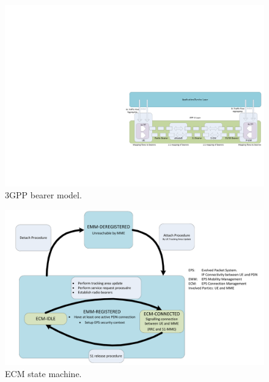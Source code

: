\begin{figure}[htb]
	\centering
	\includegraphics[width=1.2\textwidth]{images/bearers.pdf}
	\caption{3GPP bearer model.}
	\label{c4:fig:3gpp-bearers}
\end{figure}


\begin{figure}[htb]
	\centering
	\includegraphics[width=1.2\textwidth]{images/ECM-states.pdf}
	\caption{\gls{ECM} state machine.}
	\label{c4:fig:3gpp-ecmstates}
\end{figure}


